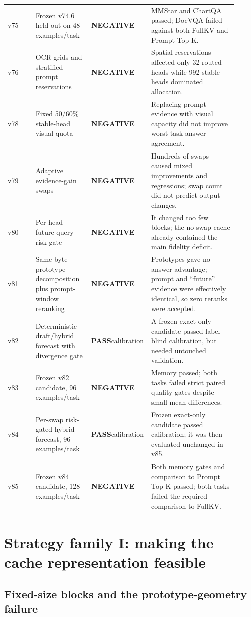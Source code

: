 \documentclass[11pt]{article}
\newcommand{\pass}{\textcolor{mkgreen}{\textbf{PASS}}}
\newcommand{\negative}{\textcolor{mkred}{\textbf{NEGATIVE}}}
\begin{document}
\begin{longtable}{p{0.12\linewidth}p{0.24\linewidth}p{0.18\linewidth}p{0.37\linewidth}}
v75 & Frozen v74.6 held-out on 48 examples/task & \negative & MMStar and ChartQA passed; DocVQA
failed against both FullKV and Prompt Top-K. \\
v76 & OCR grids and stratified prompt reservations & \negative & Spatial reservations affected
only 32 routed heads while 992 stable heads dominated allocation. \\
v78 & Fixed 50/60\% stable-head visual quota & \negative & Replacing prompt evidence with visual
capacity did not improve worst-task answer agreement. \\
v79 & Adaptive evidence-gain swaps & \negative & Hundreds of swaps caused mixed improvements and
regressions; swap count did not predict output changes. \\
v80 & Per-head future-query risk gate & \negative & It changed too few blocks; the no-swap cache
already contained the main fidelity deficit. \\
v81 & Same-byte prototype decomposition plus prompt-window reranking & \negative & Prototypes gave
no answer advantage; prompt and ``future'' evidence were effectively identical, so zero reranks
were accepted. \\
v82 & Deterministic draft/hybrid forecast with divergence gate & \pass calibration & A frozen
exact-only candidate passed label-blind calibration, but needed untouched validation. \\
v83 & Frozen v82 candidate, 96 examples/task & \negative & Memory passed; both tasks failed strict
paired quality gates despite small mean differences. \\
v84 & Per-swap risk-gated hybrid forecast, 96 examples/task & \pass calibration & Frozen exact-only
candidate passed calibration; it was then evaluated unchanged in v85. \\
v85 & Frozen v84 candidate, 128 examples/task & \negative & Both memory gates and comparison to
Prompt Top-K passed; both tasks failed the required comparison to FullKV. \\
\bottomrule
\end{longtable}

\section{Strategy family I: making the cache representation feasible}

\subsection{Fixed-size blocks and the prototype-geometry failure}
\end{document}
